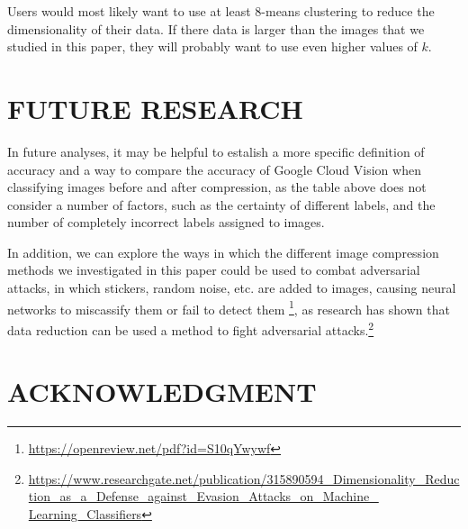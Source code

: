 \documentclass[letterpaper, 10 pt, conference]{ieeeconf}  %
\begin{document}
Users would most likely want to use at least 8-means clustering
to reduce the dimensionality of their data.
If there data is larger than the images that we studied in this paper,
they will probably want to use even higher values of $k$.

\section{FUTURE RESEARCH}

In future analyses, it may be helpful to estalish a more
specific definition of accuracy and a way to compare
the accuracy of Google Cloud Vision when classifying
images before and after compression, as the table
above does not consider a number of factors, such as
the certainty of different labels, and the number
of completely incorrect labels assigned to images.

In addition, we can explore the ways in which the different
image compression methods we investigated in this paper
could be used to combat adversarial attacks, in which
stickers, random noise, etc. are added to images, causing
neural networks to miscassify them or fail to detect them
\footnote{\url{https://openreview.net/pdf?id=S10qYwywf}},
as research has shown that data reduction can be used a method to fight
adversarial attacks.\footnote{\url{https://www.researchgate.net/publication/315890594\_Dimensionality\_Reduction\_as\_a\_Defense\_against\_Evasion\_Attacks\_on\_Machine\_ Learning\_Classifiers}}


\addtolength{\textheight}{-12cm}   %


\section*{ACKNOWLEDGMENT}
\end{document}
